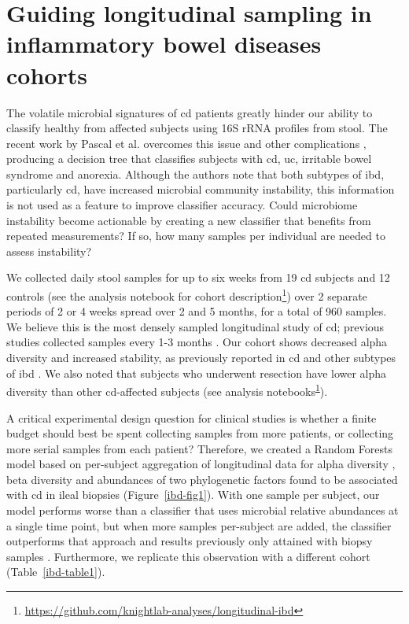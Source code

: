 \glsresetall

\section{Guiding longitudinal sampling in inflammatory bowel diseases 
cohorts}\label{section_ibd}

The volatile microbial signatures of \gls{cd} patients greatly hinder our 
ability to classify healthy from affected subjects using 16S rRNA profiles from 
stool. The recent work by Pascal et al. \cite{RN4208} overcomes this issue and 
other complications \cite{RN4219}, producing a decision tree that classifies 
subjects with \gls{cd}, \gls{uc}, irritable bowel syndrome and anorexia.  
Although the authors note that both subtypes of \gls{ibd}, particularly 
\gls{cd}, have increased microbial community instability, this information is 
not used as a feature to improve classifier accuracy. Could microbiome 
instability become actionable by creating a new classifier that benefits from 
repeated measurements? If so, how many samples per individual are needed to 
assess instability?

We collected daily stool samples for up to six weeks from 19 \gls{cd} subjects and 12 controls (see the analysis notebook for cohort description\footnote{\label{footlongibd}\url{https://github.com/knightlab-analyses/longitudinal-ibd}}) over 2 separate periods of 2 or 4 weeks spread over 2 and 5 months, for a total of 960 samples. We believe this is the most densely sampled longitudinal study of \gls{cd}; previous studies collected samples every 1-3 months \cite{RN1515, RN4208}. Our cohort shows decreased alpha diversity and increased stability, as previously reported in \gls{cd} and other subtypes of \gls{ibd} \cite{RN4217, RN154, RN1515, RN4208}.  We also noted that subjects who underwent resection have lower alpha diversity than other \gls{cd}-affected subjects (see analysis notebooks\textsuperscript{\ref{footlongibd}}).

A critical experimental design question for clinical studies is whether a finite budget should best be spent collecting samples from more patients, or collecting more serial samples from each patient? Therefore, we created a Random Forests \cite{RN4205} model based on per-subject aggregation of longitudinal data for alpha diversity \cite{RN4007}, beta diversity \cite{RN83} and abundances of two phylogenetic factors found to be associated with \gls{cd} in ileal biopsies \cite{RN154, RN4204} (Figure~\ref{ibd-fig1}). With one sample per subject, our model performs worse than a classifier that uses microbial relative abundances at a single time point, but when more samples per-subject are added, the classifier outperforms that approach and results previously only attained with biopsy samples \cite{RN154}. Furthermore, we replicate this observation with a different cohort (Table~\ref{ibd-table1}).

